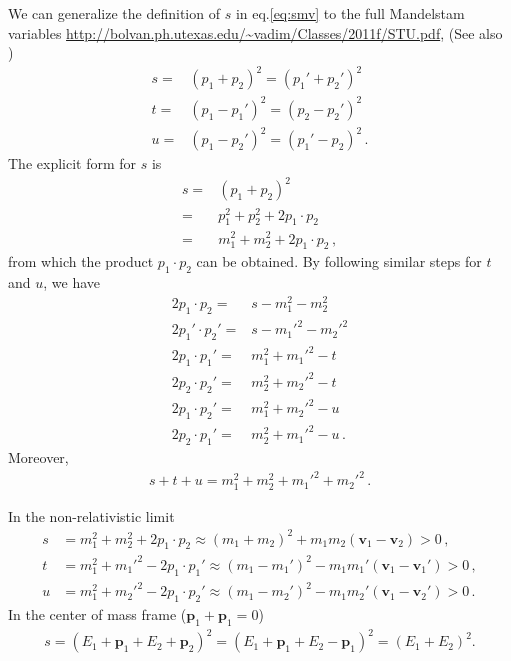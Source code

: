 We can generalize the definition of $s$ in eq.\eqref{eq:smv} to the full
Mandelstam variables \url{http://bolvan.ph.utexas.edu/~vadim/Classes/2011f/STU.pdf}, (See also \cite{Peskin})
\begin{align}
\label{eq:mvstu}
  s=&\left( p_1+p_2 \right)^2=\left( p_1'+p_2' \right)^2 \nonumber\\
  t=&\left( p_1-p_1' \right)^2=\left( p_2-p_2' \right)^2 \nonumber\\
  u=&\left( p_1-p_2' \right)^2=\left( p_1'-p_2 \right)^2 \,.
\end{align}
The explicit form for $s$ is 
\begin{align}
  s=&\left( p_1+p_2 \right)^2 \nonumber\\
 =& p_1^2+p_2^2+2 p_1\cdot p_2 \nonumber\\
=& m_1^2+m_2^2+2 p_1\cdot p_2\,,
\end{align}
from which the product $p_1\cdot p_2$ can be obtained.  By following similar steps for $t$ and $u$, we have
\begin{align}
\label{eq:stucs}
  2 p_1\cdot p_2=&s- m_1^2-m_2^2 \nonumber\\
  2 p_1'\cdot p_2'=&s- {m_1'}^2-{m_2'}^2 \nonumber\\
  2 p_1\cdot p_1'=&m_1^2+{m_1'}^2 -t \nonumber\\
  2 p_2\cdot p_2'=&m_2^2+{m_2'}^2 -t \nonumber\\
  2 p_1\cdot p_2'=&m_1^2+{m_2'}^2 -u \nonumber\\
  2 p_2\cdot p_1'=&m_2^2+{m_1'}^2 -u \,.
\end{align}
Moreover,
\begin{align}
  s+t+u=m_1^2+m_2^2+{m_1'}^2+{m_2'}^2\,.
\end{align}

In the non-relativistic limit
\begin{align}
  s&=m_1^2+m_2^2   +2 p_1\cdot p_2 \approx (m_1+m_2)^2  + m_1m_2 (\mathbf{v}_1-\mathbf{v}_2)>0\,, \nonumber\\
  t&=m_1^2+{m_1'}^2-2 p_1\cdot p_1'\approx (m_1-m_1')^2 - m_1m_1' (\mathbf{v}_1-\mathbf{v}_1')>0\,,\nonumber\\
  u&=m_1^2+{m_2'}^2-2 p_1\cdot p_2'\approx (m_1-m_2')^2 - m_1m_2'  (\mathbf{v}_1-\mathbf{v}_2')>0\,.
\end{align}
In the center of mass frame ($\boldsymbol{p}_1+\boldsymbol{p}_1=0$)
\begin{align}
  s=\left( E_1+\boldsymbol{p}_1+E_2+\boldsymbol{p}_2 \right)^2=\left( E_1+\boldsymbol{p}_1+E_2-\boldsymbol{p}_1 \right)^2=\left( E_1+E_2 \right)^2.
\end{align} 


